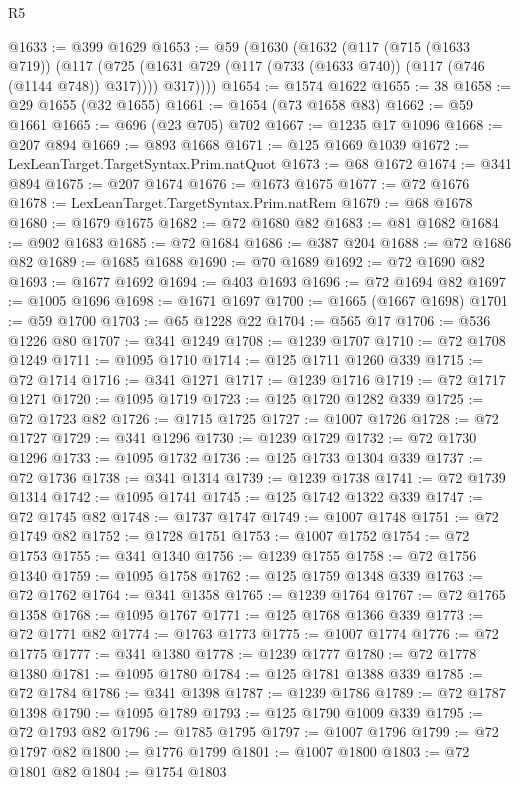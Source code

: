 \begin{lexlean}{R5}
\begin{coremodule}
{{{{{{{{{{{{{{{{{{{{{{{{{{{{{{{{{{{{{{{{{{{{{{{{{{{{{{{{{{{{{{{{{{{{{{{{{{{{{{{{{{{{{{{{{{{{@1633 := @399 @1629
@1653 := @59
    (@1630
      (@1632
        (@117
          (@715 (@1633 @719))
          (@117
            (@725 (@1631 @729 (@117 (@733 (@1633 @740)) (@117 (@746 (@1144 @748)) @317))))
            @317))))
@1654 := @1574 @1622
@1655 := 38
@1658 := @29 @1655 (@32 @1655)
@1661 := @1654 (@73 @1658 @83)
@1662 := @59 @1661
@1665 := @696 (@23 @705) @702
@1667 := @1235 @17 @1096
@1668 := @207 @894
@1669 := @893 @1668
@1671 := @125 @1669 @1039
@1672 := LexLeanTarget.TargetSyntax.Prim.natQuot
@1673 := @68 @1672
@1674 := @341 @894
@1675 := @207 @1674
@1676 := @1673 @1675
@1677 := @72 @1676
@1678 := LexLeanTarget.TargetSyntax.Prim.natRem
@1679 := @68 @1678
@1680 := @1679 @1675
@1682 := @72 @1680 @82
@1683 := @81 @1682
@1684 := @902 @1683
@1685 := @72 @1684
@1686 := @387 @204
@1688 := @72 @1686 @82
@1689 := @1685 @1688
@1690 := @70 @1689
@1692 := @72 @1690 @82
@1693 := @1677 @1692
@1694 := @403 @1693
@1696 := @72 @1694 @82
@1697 := @1005 @1696
@1698 := @1671 @1697
@1700 := @1665 (@1667 @1698)
@1701 := @59 @1700
@1703 := @65 @1228 @22
@1704 := @565 @17
@1706 := @536 @1226 @80
@1707 := @341 @1249
@1708 := @1239 @1707
@1710 := @72 @1708 @1249
@1711 := @1095 @1710
@1714 := @125 @1711 @1260 @339
@1715 := @72 @1714
@1716 := @341 @1271
@1717 := @1239 @1716
@1719 := @72 @1717 @1271
@1720 := @1095 @1719
@1723 := @125 @1720 @1282 @339
@1725 := @72 @1723 @82
@1726 := @1715 @1725
@1727 := @1007 @1726
@1728 := @72 @1727
@1729 := @341 @1296
@1730 := @1239 @1729
@1732 := @72 @1730 @1296
@1733 := @1095 @1732
@1736 := @125 @1733 @1304 @339
@1737 := @72 @1736
@1738 := @341 @1314
@1739 := @1239 @1738
@1741 := @72 @1739 @1314
@1742 := @1095 @1741
@1745 := @125 @1742 @1322 @339
@1747 := @72 @1745 @82
@1748 := @1737 @1747
@1749 := @1007 @1748
@1751 := @72 @1749 @82
@1752 := @1728 @1751
@1753 := @1007 @1752
@1754 := @72 @1753
@1755 := @341 @1340
@1756 := @1239 @1755
@1758 := @72 @1756 @1340
@1759 := @1095 @1758
@1762 := @125 @1759 @1348 @339
@1763 := @72 @1762
@1764 := @341 @1358
@1765 := @1239 @1764
@1767 := @72 @1765 @1358
@1768 := @1095 @1767
@1771 := @125 @1768 @1366 @339
@1773 := @72 @1771 @82
@1774 := @1763 @1773
@1775 := @1007 @1774
@1776 := @72 @1775
@1777 := @341 @1380
@1778 := @1239 @1777
@1780 := @72 @1778 @1380
@1781 := @1095 @1780
@1784 := @125 @1781 @1388 @339
@1785 := @72 @1784
@1786 := @341 @1398
@1787 := @1239 @1786
@1789 := @72 @1787 @1398
@1790 := @1095 @1789
@1793 := @125 @1790 @1009 @339
@1795 := @72 @1793 @82
@1796 := @1785 @1795
@1797 := @1007 @1796
@1799 := @72 @1797 @82
@1800 := @1776 @1799
@1801 := @1007 @1800
@1803 := @72 @1801 @82
@1804 := @1754 @1803
}}}}}}}}}}}}}}}}}}}}}}}}}}}}}}}}}}}}}}}}}}}}}}}}}}}}}}}}}}}}}}}}}}}}}}}}}}}}}}}}}}}}}}}}}}}}
\end{coremodule}
\end{lexlean}
